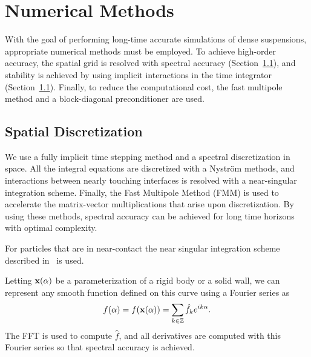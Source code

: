 \documentclass[preprint, 10pt]{elsarticle}
\begin{document}
		
\section{Numerical Methods\label{s:method}} 
With the goal of performing long-time accurate simulations of dense
suspensions, appropriate numerical methods must be employed.  To achieve
high-order accuracy, the spatial grid is resolved with spectral accuracy
(Section~\ref{}), and stability is achieved by using implicit
interactions in the time integrator (Section~\ref{}).  Finally, to
reduce the computational cost, the fast multipole method and a
block-diagonal preconditioner are used.


\subsection{Spatial Discretization}
We use a fully implicit time stepping method and a spectral
discretization in space.  All the integral equations are discretized
with a Nystr\"om  methods, and interactions between nearly touching
interfaces is resolved with a near-singular integration scheme.
Finally, the Fast Multipole Method (FMM) is used to accelerate the
matrix-vector multiplications that arise upon discretization.  By using
these methods, spectral accuracy can be achieved for long time horizons
with optimal complexity.

For particles that are in near-contact the near singular
integration scheme described in~\cite{Quaife2014, Ying2006} is used.


Letting ${\mathbf{x}}(\alpha)$ be a parameterization of a rigid body or a solid
wall, we can represent any smooth function defined on this curve using a
Fourier series as
\begin{align}
  f(\alpha) = f({\mathbf{x}}(\alpha)) = \sum_{k \in {\mathbb{Z}}} \hat{f}_k e^{ik\alpha}.
\end{align}
The FFT is used to compute $\hat{f}$, and all derivatives are computed
with this Fourier series so that spectral accuracy is achieved.
\end{document}
